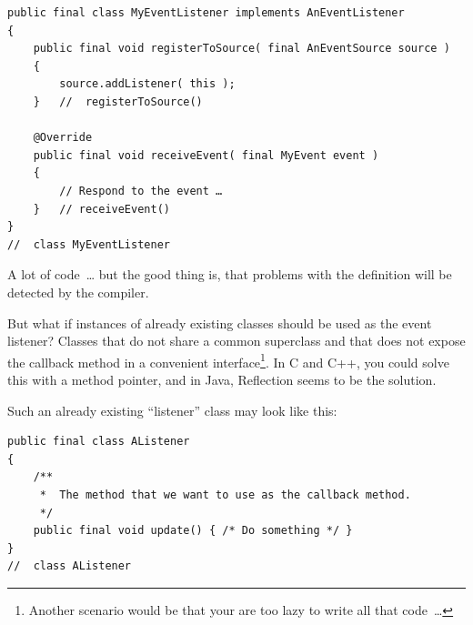 \begin{lstlisting}
public final class MyEventListener implements AnEventListener
{
    public final void registerToSource( final AnEventSource source )
    {
        source.addListener( this );
    }	//	registerToSource()

    @Override    
    public final void receiveEvent( final MyEvent event )
    {
        // Respond to the event …
    }   // receiveEvent()
}
//  class MyEventListener
\end{lstlisting}

A lot of code~… but the good thing is, that problems with the definition will be detected by the compiler.

But what if instances of already existing classes should be used as the event listener? Classes that do not share a common superclass and that does not expose the callback method in a convenient interface\footnote{Another scenario would be that your are too lazy to write all that code~…}. In C and C++, you could solve this with a method pointer, and in Java, Reflection seems to be the solution.

Such an already existing “listener” class may look like this:
\begin{lstlisting}
public final class AListener
{
    /**
     *  The method that we want to use as the callback method.
     */
    public final void update() { /* Do something */ }
}
//  class AListener
\end{lstlisting}

